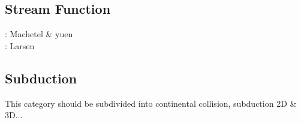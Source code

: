 \subsection{Stream Function} 

\begin{scriptsize}
\noindent
\nineteeneightynine: Machetel \& yuen \cite{mayu89} \\
\nineteenninetysix: Larsen \etal \cite{laym96} \\
\end{scriptsize}


\subsection{Subduction} 
This category should be subdivided into continental collision, subduction 2D \& 3D...

